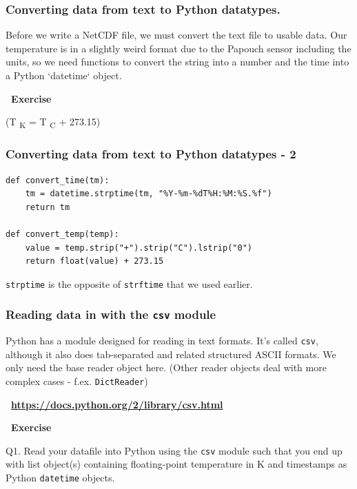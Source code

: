 \documentclass[aspectratio=1610,9pt]{beamer} %
\newcommand\myheading[1]{%
  \par\bigskip
  {\Large\bfseries\center~#1}\par\smallskip}
\begin{document}
\begin{frame}
\frametitle{Converting data from text to Python
datatypes.}

Before we write a NetCDF file, we must convert the text file to usable
data. Our temperature is in a slightly weird format due to the Papouch
sensor including the units, so we need functions to convert the string
into a number and the time into a Python `datetime` object.

\myheading{Exercise}



(T \textsubscript{K} = T \textsubscript{C} + 273.15)

\end{frame}
\begin{frame}[fragile]
\frametitle{Converting data from text to Python datatypes -
2}

\begin{verbatim}
def convert_time(tm):
    tm = datetime.strptime(tm, "%Y-%m-%dT%H:%M:%S.%f")
    return tm

def convert_temp(temp):
    value = temp.strip("+").strip("C").lstrip("0")
    return float(value) + 273.15
\end{verbatim}

\texttt{strptime} is the opposite of \texttt{strftime} that we used
earlier.

\end{frame}
\begin{frame}
\frametitle{Reading data in with the \texttt{csv}
module}

Python has a module designed for reading in text formats. It's called
\texttt{csv}, although it also does tab-separated and related structured
ASCII formats. We only need the base reader object here. (Other reader
objects deal with more complex cases - f.ex. \texttt{DictReader})

\myheading{\href{https://docs.python.org/2/library/csv.html}{https://docs.python.org/2/library/csv.html}}

\myheading{Exercise}

Q1. Read your datafile into Python using the \texttt{csv} module such
that you end up with list object(s) containing floating-point
temperature in K and timestamps as Python \texttt{datetime} objects.

\end{frame}
\end{document}
